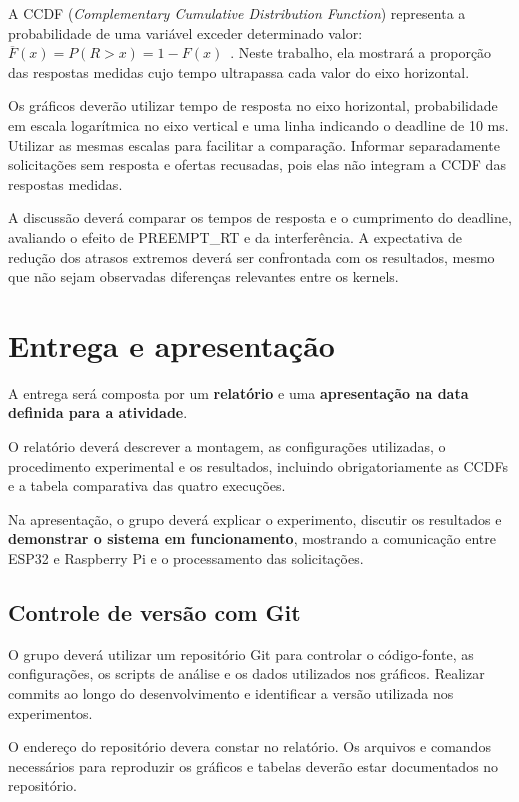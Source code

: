 \documentclass[11pt,a4paper]{article}
\begin{document}
A CCDF (\emph{Complementary Cumulative Distribution Function})
representa a probabilidade de uma variável exceder determinado valor:
$\overline{F}(x)=P(R>x)=1-F(x)$~\cite{ccdf}.
Neste trabalho, ela mostrará a proporção das respostas medidas cujo
tempo ultrapassa cada valor do eixo horizontal.

Os gráficos deverão utilizar tempo de resposta no eixo horizontal,
probabilidade em escala logarítmica no eixo vertical e uma linha
indicando o deadline de 10 ms. Utilizar as mesmas escalas para
facilitar a comparação. Informar separadamente solicitações sem
resposta e ofertas recusadas, pois elas não integram a CCDF
das respostas medidas.

A discussão deverá comparar os tempos de resposta e o cumprimento
do deadline, avaliando o efeito de PREEMPT\_RT e da interferência.
A expectativa de redução dos atrasos extremos deverá ser confrontada
com os resultados, mesmo que não sejam observadas diferenças
relevantes entre os kernels.

\section{Entrega e apresentação}

A entrega será composta por um \textbf{relatório} e uma \textbf{apresentação na data definida para a atividade}.

O relatório deverá descrever a montagem, as configurações utilizadas, o procedimento experimental e os resultados, incluindo obrigatoriamente as CCDFs e a tabela comparativa das quatro execuções.

Na apresentação, o grupo deverá explicar o experimento, discutir os resultados e \textbf{demonstrar o sistema em funcionamento}, mostrando a comunicação entre ESP32 e Raspberry Pi e o processamento das solicitações.

\subsection{Controle de versão com Git}

O grupo deverá utilizar um repositório Git para controlar o código-fonte, as configurações, os scripts de análise e os dados utilizados nos gráficos. Realizar commits ao longo do desenvolvimento e identificar a versão utilizada nos experimentos.

O endereço do repositório devera constar no relatório. Os arquivos e comandos necessários para reproduzir os gráficos e tabelas deverão estar documentados no repositório.
\end{document}
